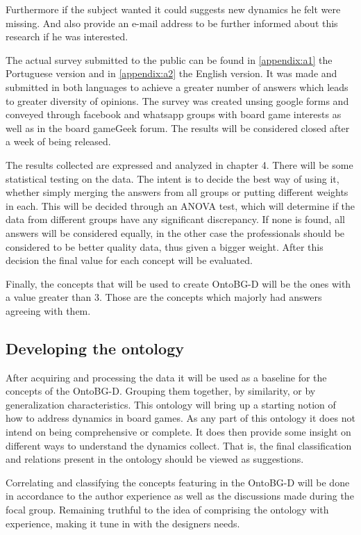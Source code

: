 Furthermore if the subject wanted it could suggests new dynamics he felt were missing. And also provide an e-mail address to be further informed about this research if he was interested. 

The actual survey submitted to the public can be found in \autoref{appendix:a1} the Portuguese version and in \autoref{appendix:a2} the English version. It was made and submitted in both languages to achieve a greater number of answers which leads to greater diversity of opinions. The survey was created unsing google forms and conveyed through facebook and whatsapp groups with board game interests as well as in the board gameGeek forum. The results will be considered closed after a week of being released.

The results collected are expressed and analyzed in chapter 4. There will be some statistical testing on the data. The intent is to decide the best way of using it, whether simply merging the answers from all groups or putting different weights in each. This will be decided through an ANOVA test, which will determine if the data from different groups have any significant discrepancy. If none is found, all answers will be considered equally, in the other case the professionals should be considered to be better quality data, thus given a bigger weight. After this decision the final value for each concept will be evaluated.

Finally, the concepts that will be used to create OntoBG-D will be the ones with a value greater than 3. Those are the concepts which majorly had answers agreeing with them.

\subsection{Developing the ontology}

After acquiring and processing the data it will be used as a baseline for the concepts of the OntoBG-D. Grouping them together, by similarity, or by generalization characteristics. This ontology will bring up a starting notion of how to address dynamics in board games. As any part of this ontology it does not intend on being comprehensive or complete. It does then provide some insight on different ways to understand the dynamics collect. That is, the final classification and relations present in the ontology should be viewed as suggestions.

Correlating and classifying the concepts featuring in the OntoBG-D will be done in accordance to the author experience as well as the discussions made during the focal group. Remaining truthful to the idea of comprising the ontology with experience, making it tune in with the designers needs.